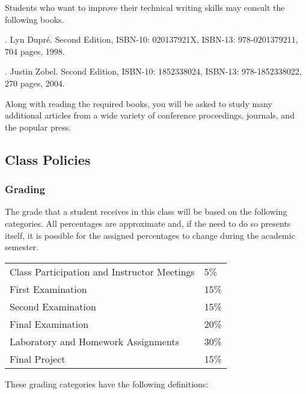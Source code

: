 \noindent
Students who want to improve their technical writing skills may consult the following books.

. Lyn Dupr\'e. Second Edition,  ISBN-10: 020137921X,
ISBN-13: 978-0201379211, 704 pages, 1998.

.  Justin Zobel. Second Edition,  ISBN-10: 1852338024, ISBN-13:
978-1852338022, 270 pages, 2004.

\noindent
Along with reading the required books, you will be asked to study many additional articles from a wide variety of
conference proceedings, journals, and the popular press.

\subsection*{Class Policies}

\subsubsection*{Grading}

The grade that a student receives in this class will be based on the following categories. All percentages are
approximate and, if the need to do so presents itself, it is possible for the assigned percentages to change during the
academic semester. 

\begin{center}
  \begin{tabular}{ll}
    Class Participation and Instructor Meetings & 5\% \\
    First Examination & 15\% \\
    Second Examination & 15\% \\
    Final Examination & 20\% \\
    Laboratory and Homework Assignments & 30\% \\
    Final Project & 15\%
  \end{tabular}
\end{center}

\vspace*{-.1in}
\noindent
These grading categories have the following definitions:
\vspace*{-.1in}


